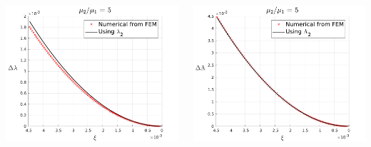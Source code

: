 \documentclass{beamer}
\begin{document}
\begin{frame}
\begin{columns}
		\center \includegraphics[width = \textwidth]{myFigures/lambdaCheck_pieceConst_1}
		
				\center \includegraphics[width = \textwidth]{myFigures/lambdaCheck_pieceConst_2}
	\end{columns}
	
	
\end{frame}
\end{document}

